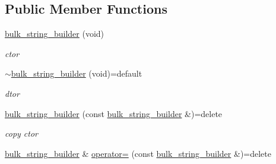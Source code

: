 \subsection*{Public Member Functions}
\begin{DoxyCompactItemize}
\item 
\mbox{\label{classcpp__redis_1_1builders_1_1bulk__string__builder_a1c0bee3cd6fbafc782cfe93c0b650451}} 
\hyperlink{classcpp__redis_1_1builders_1_1bulk__string__builder_a1c0bee3cd6fbafc782cfe93c0b650451}{bulk\+\_\+string\+\_\+builder} (void)
\begin{DoxyCompactList}\small\item\em ctor \end{DoxyCompactList}\item 
\mbox{\label{classcpp__redis_1_1builders_1_1bulk__string__builder_a88c7142bab456f70da9f9a6252e2affb}} 
\hyperlink{classcpp__redis_1_1builders_1_1bulk__string__builder_a88c7142bab456f70da9f9a6252e2affb}{$\sim$bulk\+\_\+string\+\_\+builder} (void)=default
\begin{DoxyCompactList}\small\item\em dtor \end{DoxyCompactList}\item 
\mbox{\label{classcpp__redis_1_1builders_1_1bulk__string__builder_ac3bd10f8972fa1856b6e7b7262ecd98f}} 
\hyperlink{classcpp__redis_1_1builders_1_1bulk__string__builder_ac3bd10f8972fa1856b6e7b7262ecd98f}{bulk\+\_\+string\+\_\+builder} (const \hyperlink{classcpp__redis_1_1builders_1_1bulk__string__builder}{bulk\+\_\+string\+\_\+builder} \&)=delete
\begin{DoxyCompactList}\small\item\em copy ctor \end{DoxyCompactList}\item 
\mbox{\label{classcpp__redis_1_1builders_1_1bulk__string__builder_a972355e0910faa9e3daf4f5c67c3e581}} 
\hyperlink{classcpp__redis_1_1builders_1_1bulk__string__builder}{bulk\+\_\+string\+\_\+builder} \& \hyperlink{classcpp__redis_1_1builders_1_1bulk__string__builder_a972355e0910faa9e3daf4f5c67c3e581}{operator=} (const \hyperlink{classcpp__redis_1_1builders_1_1bulk__string__builder}{bulk\+\_\+string\+\_\+builder} \&)=delete

\end{DoxyCompactItemize}
